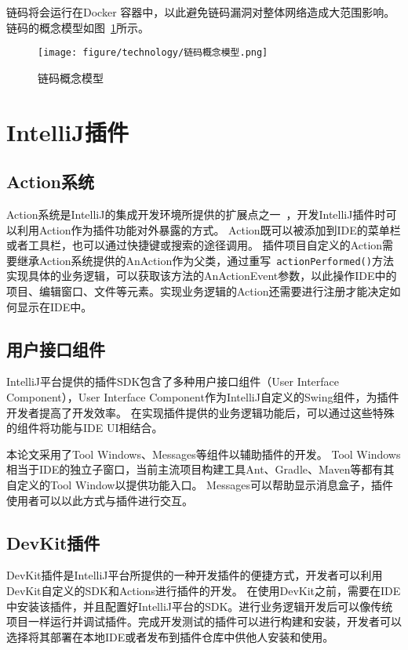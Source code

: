 链码将会运行在Docker 容器中，以此避免链码漏洞对整体网络造成大范围影响。
链码的概念模型如图~\ref{fig:2.4}所示。

\begin{figure}[htb]
  \centering
  \texttt{[image: figure/technology/链码概念模型.png]}
  \caption{链码概念模型}\label{fig:2.4}
\end{figure}

\section{IntelliJ插件}

\subsection{Action系统}

Action系统是IntelliJ的集成开发环境所提供的扩展点之一~\cite{DBLP:conf/sigsoft/HajjN20}，开发IntelliJ插件时可以利用Action作为插件功能对外暴露的方式。
Action既可以被添加到IDE的菜单栏或者工具栏，也可以通过快捷键或搜索的途径调用。
插件项目自定义的Action需要继承Action系统提供的AnAction作为父类，通过重写~\texttt{actionPerformed()}方法实现具体的业务逻辑，可以获取该方法的AnActionEvent参数，以此操作IDE中的项目、编辑窗口、文件等元素。实现业务逻辑的Action还需要进行注册才能决定如何显示在IDE中。

\subsection{用户接口组件}

IntelliJ平台提供的插件SDK包含了多种用户接口组件（User Interface Component），User Interface Component作为IntelliJ自定义的Swing组件，为插件开发者提高了开发效率。
在实现插件提供的业务逻辑功能后，可以通过这些特殊的组件将功能与IDE UI相结合。

本论文采用了Tool Windows、Messages等组件以辅助插件的开发。
Tool Windows相当于IDE的独立子窗口，当前主流项目构建工具Ant、Gradle、Maven等都有其自定义的Tool Window以提供功能入口。
Messages可以帮助显示消息盒子，插件使用者可以以此方式与插件进行交互。

\subsection{DevKit插件}

DevKit插件是IntelliJ平台所提供的一种开发插件的便捷方式，开发者可以利用DevKit自定义的SDK和Actions进行插件的开发。
在使用DevKit之前，需要在IDE中安装该插件，并且配置好IntelliJ平台的SDK。进行业务逻辑开发后可以像传统项目一样运行并调试插件。完成开发测试的插件可以进行构建和安装，开发者可以选择将其部署在本地IDE或者发布到插件仓库中供他人安装和使用。

